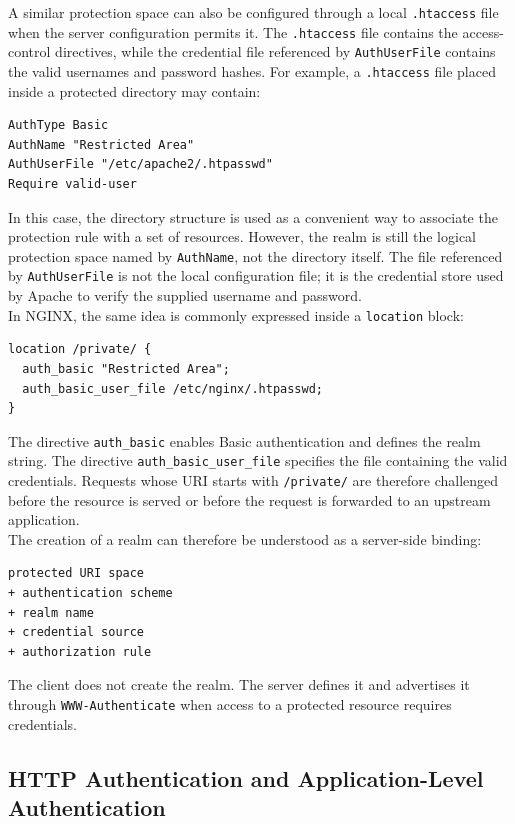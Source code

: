 \documentclass{scrbook}
\begin{document}
A similar protection space can also be configured through a local \texttt{.htaccess} file when the server configuration permits it. The \texttt{.htaccess} file contains the access-control directives, while the credential file referenced by \texttt{AuthUserFile} contains the valid usernames and password hashes. For example, a \texttt{.htaccess} file placed inside a protected directory may contain:

\begin{lstlisting}
AuthType Basic
AuthName "Restricted Area"
AuthUserFile "/etc/apache2/.htpasswd"
Require valid-user
\end{lstlisting}

In this case, the directory structure is used as a convenient way to associate the protection rule with a set of resources. However, the realm is still the logical protection space named by \texttt{AuthName}, not the directory itself. The file referenced by \texttt{AuthUserFile} is not the local configuration file; it is the credential store used by Apache to verify the supplied username and password.\\

In NGINX, the same idea is commonly expressed inside a \texttt{location} block:

\begin{lstlisting}
location /private/ {
  auth_basic "Restricted Area";
  auth_basic_user_file /etc/nginx/.htpasswd;
}
\end{lstlisting}

The directive \texttt{auth\_basic} enables Basic authentication and defines the realm string. The directive \texttt{auth\_basic\_user\_file} specifies the file containing the valid credentials. Requests whose URI starts with \texttt{/private/} are therefore challenged before the resource is served or before the request is forwarded to an upstream application.\\

The creation of a realm can therefore be understood as a server-side binding:

\begin{lstlisting}
protected URI space
+ authentication scheme
+ realm name
+ credential source
+ authorization rule
\end{lstlisting}

The client does not create the realm. The server defines it and advertises it through \texttt{WWW-Authenticate} when access to a protected resource requires credentials.

\subsection{HTTP Authentication and Application-Level Authentication}
\end{document}
